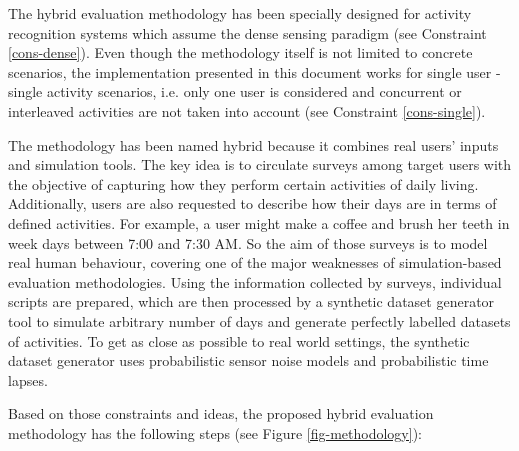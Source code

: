 \begin{comment}
 - Describe target scenario: dense sensing, single user - single activity
 - Explain in detail the steps: survey, script writing, sensor modelling, synthetic dataset generator 
\end{comment}

The hybrid evaluation methodology has been specially designed for activity recognition systems which assume the dense sensing paradigm (see Constraint \ref{cons-dense}). Even though the methodology itself is not limited to concrete scenarios, the implementation presented in this document works for single user - single activity scenarios, i.e. only one user is considered and concurrent or interleaved activities are not taken into account (see Constraint \ref{cons-single}). 

The methodology has been named hybrid because it combines real users’ inputs and simulation tools. The key idea is to circulate surveys among target users with the objective of capturing how they perform certain activities of daily living. Additionally, users are also requested to describe how their days are in terms of defined activities. For example, a user might make a coffee and brush her teeth in week days between 7:00 and 7:30 AM. So the aim of those surveys is to model real human behaviour, covering one of the major weaknesses of simulation-based evaluation methodologies. Using the information collected by surveys, individual scripts are prepared, which are then processed by a synthetic dataset generator tool to simulate arbitrary number of days and generate perfectly labelled datasets of activities. To get as close as possible to real world settings, the synthetic dataset generator uses probabilistic sensor noise models and probabilistic time lapses.

Based on those constraints and ideas, the proposed hybrid evaluation methodology has the following steps (see Figure \ref{fig-methodology}):

